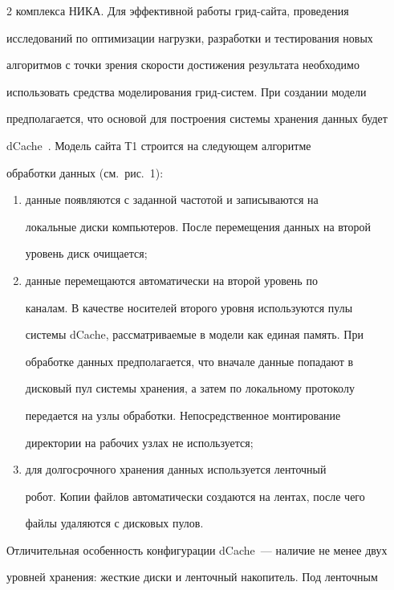 \begin{multicols}{2}
комплекса \mbox{НИКА}. Для эффективной работы грид-сай\-та, проведения 


исследований по оптимизации нагрузки, разработки и тестирования новых 


алгоритмов с точки зрения скорости достижения результата необходимо 


использовать средства моделирования грид-сис\-тем. При создании модели 


предполагается, что основой для построения системы хранения данных будет 


dCache~\cite{8-kor}. Модель сайта Т1 строится на следующем алгоритме 


обработки данных (см.\ рис.~1): 


   \begin{enumerate}[(1)]


\item данные появляются с заданной частотой и записываются на 


локальные диски компьютеров. После перемещения данных на второй 


уровень диск очищается;


\item данные перемещаются автоматически на второй уровень по 


каналам. В качестве носителей второго уровня используются пулы 


системы dCache, рассматриваемые в модели как единая память. При 


обработке данных предполагается, что вначале данные попадают в 


дисковый пул системы хранения, а затем по локальному протоколу 


передается на узлы обработки. Непосредственное монтирование 


директории на рабочих узлах не используется;


\item для долгосрочного хранения данных используется ленточный 


робот. Копии файлов автоматически создаются на лентах, после чего 


файлы удаляются с дисковых пулов. 


\end{enumerate}





   Отличительная особенность конфигурации dCache~--- наличие не менее двух 


уровней хранения: жесткие диски и ленточный накопитель. Под ленточным 



\end{multicols}
